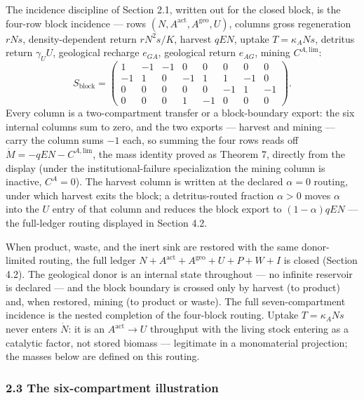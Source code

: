 \documentclass[11pt]{article}
\begin{document}
The incidence discipline of Section 2.1, written out for the closed
block, is the four-row block incidence --- rows
\((N, A^{\mathrm{act}}, A^{\mathrm{geo}}, U)\), columns gross
regeneration \(rNs\), density-dependent return \(rN^2 s/K\), harvest
\(qEN\), uptake \(T = \kappa_A N s\), detritus return \(\gamma_U U\),
geological recharge \(e_{GA}\), geological return \(e_{AG}\), mining
\(C^{A,\mathrm{lim}}\): \[S_{\mathrm{block}} =
\begin{pmatrix}
1 & -1 & -1 & 0 & 0 & 0 & 0 & 0 \\
-1 & 1 & 0 & -1 & 1 & 1 & -1 & 0 \\
0 & 0 & 0 & 0 & 0 & -1 & 1 & -1 \\
0 & 0 & 0 & 1 & -1 & 0 & 0 & 0
\end{pmatrix}.\] Every column is a two-compartment transfer or a
block-boundary export: the six internal columns sum to zero, and the two
exports --- harvest and mining --- carry the column sums \(-1\) each, so
summing the four rows reads off \(\dot M = -qEN - C^{A,\mathrm{lim}}\),
the mass identity proved as Theorem 7, directly from the display (under
the institutional-failure specialization the mining column is inactive,
\(C^A = 0\)). The harvest column is written at the declared
\(\alpha = 0\) routing, under which harvest exits the block; a
detritus-routed fraction \(\alpha > 0\) moves \(\alpha\) into the \(U\)
entry of that column and reduces the block export to \((1-\alpha)qEN\)
--- the full-ledger routing displayed in Section 4.2.

When product, waste, and the inert sink are restored with the same
donor-limited routing, the full ledger
\(N + A^{\mathrm{act}} + A^{\mathrm{geo}} + U + P + W + I\) is closed
(Section 4.2). The geological donor is an internal state throughout ---
no infinite reservoir is declared --- and the block boundary is crossed
only by harvest (to product) and, when restored, mining (to product or
waste). The full seven-compartment incidence is the nested completion of
the four-block routing. Uptake \(T = \kappa_A N s\) never enters
\(\dot N\): it is an \(A^{\mathrm{act}} \to U\) throughput with the
living stock entering as a catalytic factor, not stored biomass ---
legitimate in a monomaterial projection; the masses below are defined on
this routing.

\subsubsection{2.3 The six-compartment
illustration}\label{the-six-compartment-illustration}
\end{document}

